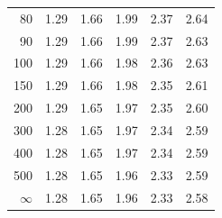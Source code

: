 \begin{center}
\begin{tabular}{r | rrr rr}
80  &  {\normalsize  1.29} & {\normalsize  1.66} & {\normalsize  1.99} & {\normalsize  2.37} & {\normalsize  2.64}  \\ 
90  &  {\normalsize  1.29} & {\normalsize  1.66} & {\normalsize  1.99} & {\normalsize  2.37} & {\normalsize  2.63}  \\ 
100  &  {\normalsize  1.29} & {\normalsize  1.66} & {\normalsize  1.98} & {\normalsize  2.36} & {\normalsize  2.63}  \\ 
\hline
150  &  {\normalsize  1.29} & {\normalsize  1.66} & {\normalsize  1.98} & {\normalsize  2.35} & {\normalsize  2.61}  \\ 
200  &  {\normalsize  1.29} & {\normalsize  1.65} & {\normalsize  1.97} & {\normalsize  2.35} & {\normalsize  2.60}  \\ 
300  &  {\normalsize  1.28} & {\normalsize  1.65} & {\normalsize  1.97} & {\normalsize  2.34} & {\normalsize  2.59}  \\ 
400  &  {\normalsize  1.28} & {\normalsize  1.65} & {\normalsize  1.97} & {\normalsize  2.34} & {\normalsize  2.59}  \\ 
500  &  {\normalsize  1.28} & {\normalsize  1.65} & {\normalsize  1.96} & {\normalsize  2.33} & {\normalsize  2.59}  \\ 
\hline
\hline
$\infty$  &  {\normalsize  1.28} & {\normalsize  1.65} & {\normalsize  1.96} & {\normalsize  2.33} & {\normalsize  2.58}  \\ 
\hline
\end{tabular}
\end{center}

